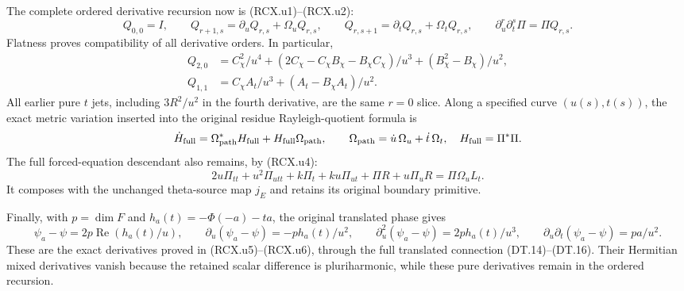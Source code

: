 The complete ordered derivative recursion now is
(RCX.u1)--(RCX.u2):
\[
 Q_{0,0}=I,\qquad
 Q_{r+1,s}=\partial_uQ_{r,s}+\Omega_uQ_{r,s},\qquad
 Q_{r,s+1}=\partial_tQ_{r,s}+\Omega_tQ_{r,s},\qquad
 \partial_u^r\partial_t^s\Pi=\Pi Q_{r,s}.
\]
Flatness proves compatibility of all derivative orders.
In particular,
\[
 \begin{aligned}
 Q_{2,0}
   &=C_\chi^2/u^4+
       (2C_\chi-C_\chi B_\chi-B_\chi C_\chi)/u^3
                       +(B_\chi^2-B_\chi)/u^2,\\
 Q_{1,1}
   &=C_\chi A_t/u^3+(A_t-B_\chi A_t)/u^2.
 \end{aligned}
\]
All earlier pure \(t\) jets, including \(3R^2/u^2\)
in the fourth derivative, are the same \(r=0\) slice.
Along a specified curve \((u(s),t(s))\), the exact
metric variation inserted into the original residue
Rayleigh-quotient formula is
\[
 \dot H_{\rm full}
   =\Omega_{\rm path}^*H_{\rm full}
            +H_{\rm full}\Omega_{\rm path},\qquad
 \Omega_{\rm path}=\dot u\,\Omega_u+\dot t\,\Omega_t,
 \quad H_{\rm full}=\Pi^*\Pi .
\]
The full forced-equation descendant also remains, by (RCX.u4):
\[
 2u\Pi_{tt}+u^2\Pi_{utt}+k\Pi_t+ku\Pi_{ut}
       +\Pi R+u\Pi_uR=\Pi\Omega_u L_t.
\]
It composes with the unchanged theta-source map \(j_E\)
and retains its original boundary primitive.

Finally, with \(p=\dim F\) and
\(h_a(t)=-\Phi(-a)-ta\), the original translated phase gives
\[
 \psi_a-\psi=2p\operatorname{Re}(h_a(t)/u),\qquad
 \partial_u(\psi_a-\psi)=-p h_a(t)/u^2,\qquad
 \partial_u^2(\psi_a-\psi)=2p h_a(t)/u^3,\qquad
 \partial_u\partial_t(\psi_a-\psi)=pa/u^2 .
\]
These are the exact derivatives proved in
(RCX.u5)--(RCX.u6), through the full translated
connection (DT.14)--(DT.16).  Their Hermitian mixed
derivatives vanish because the retained scalar
difference is pluriharmonic, while these pure
derivatives remain in the ordered recursion.

